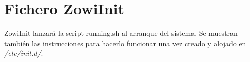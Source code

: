 
\chapter{Fichero ZowiInit} %

\label{app:zowiinit} %

ZowiInit lanzará la script running.sh al arranque del sistema. Se muestran también las instrucciones para hacerlo funcionar una vez creado y alojado en \textit{/etc/init.d/}.

\newpage



